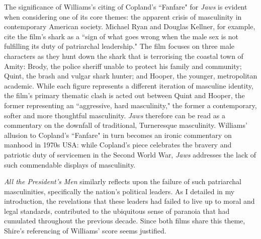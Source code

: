 The significance of Williams's citing of Copland's ``Fanfare" for \textit{Jaws} is evident when considering one of its core themes: the apparent crisis of masculinity in contemporary American society.
Michael Ryan and Douglas Kellner, for example, cite the film's shark as a ``sign of what goes wrong when the male sex is not fulfilling its duty of patriarchal leadership."\autocites[][60]{ryan_camera_1988}
The film focuses on three male characters as they hunt down the shark that is terrorising the coastal town of Amity: Brody, the police sheriff unable to protect his family and community; Quint, the brash and vulgar shark hunter; and Hooper, the younger, metropolitan academic.
While each figure represents a different iteration of masculine identity, the film's primary thematic clash is acted out between Quint and Hooper, the former representing an ``aggressive, hard masculinity," the former a contemporary, softer and more thoughtful masculinity.\autocites[Barry Monahan focuses on this theme, paying attention to the significance of characters' hands. Monahan specifically cites one scene in which Quint denigrates Hooper for having ``city hands," an apparently feminine trait that betrays his lack of traditional American manhood.][250-251]{monahan_hands_2022}
\textit{Jaws} therefore can be read as a commentary on the downfall of traditional, Turneresque masculinity.
Williams' allusion to Copland's ``Fanfare" in turn becomes an ironic commentary on manhood in 1970s USA:
while Copland's piece celebrates the bravery and patriotic duty of servicemen in the Second World War, \textit{Jaws} addresses the lack of such commendable displays of masculinity.

\textit{All the President's Men} similarly reflects upon the failure of such patriarchal masculinities, specifically the nation's political leaders.
As I detailed in my introduction, the revelations that these leaders had failed to live up to moral and legal standards, contributed to the ubiquitous sense of paranoia that had cumulated throughout the previous decade.
Since both films share this theme, Shire's referencing of Williams' score seems justified.\autocites[This connection is exacerbated in some analyses of \textit{Jaws} which draw a parallel between President Nixon and Amity's Major Vaughn, who insists on keeping the beaches open to maximise tourist revenue despite the evident threat posed by the shark. Peter Biskind, for example, notes that Vaughn ``repeatedly invokes `the public interest' as Nixon invoked `national security' to legitimate the various extravagances of his administration."][]{biskind_jaws_1975}

